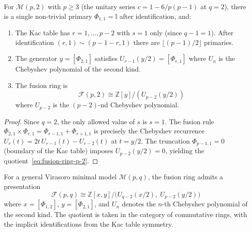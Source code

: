 \begin{proposition}\label{prop:fusion-ring-p-2}
For $\mathcal{M}(p,2)$ with $p \geq 3$ (the unitary series $c = 1 - 6/p(p{-}1)$
at $q = 2$), there is a single non-trivial primary $\Phi_{1,1} = \mathbb{I}$
after identification, and:
\begin{enumerate}
\item The Kac table has $r = 1, \ldots, p{-}2$ with $s = 1$ only (since $q{-}1 = 1$).
After identification $(r,1) \sim (p{-}1{-}r, 1)$ there are $\lfloor(p{-}1)/2\rfloor$ primaries.
\item The generator $y = [\Phi_{2,1}]$ satisfies
$U_{r-1}(y/2) = [\Phi_{r,1}]$ where $U_n$ is the Chebyshev polynomial
of the second kind.
\item The fusion ring is
\begin{equation}\label{eq:fusion-ring-p-2}
\mathcal{F}(p,2) \cong \mathbb{Z}[y]/(U_{p-2}(y/2))
\end{equation}
where $U_{p-2}$ is the $(p{-}2)$-nd Chebyshev polynomial.
\end{enumerate}
\end{proposition}

\begin{proof}
Since $q = 2$, the only allowed value of $s$ is $s = 1$.  The fusion rule
$\Phi_{2,1}\times\Phi_{r,1} = \Phi_{r-1,1} + \Phi_{r+1,1}$ is precisely the
Chebyshev recurrence $U_r(t) = 2t\,U_{r-1}(t) - U_{r-2}(t)$ at $t = y/2$.
The truncation $\Phi_{p-1,1} = 0$ (boundary of the Kac table) imposes
$U_{p-2}(y/2) = 0$, yielding the quotient~\eqref{eq:fusion-ring-p-2}.
\end{proof}

\begin{theorem}\label{thm:fusion-ring-quotient}
For a general Virasoro minimal model $\mathcal{M}(p,q)$, the fusion ring admits
a presentation
\begin{equation}\label{eq:fusion-ring-pq}
\mathcal{F}(p,q) \cong \mathbb{Z}[x,y]\big/\bigl(U_{q-2}(x/2),\; U_{p-2}(y/2)\bigr)
\end{equation}
where $x = [\Phi_{1,2}]$, $y = [\Phi_{2,1}]$, and $U_n$ denotes the $n$-th
Chebyshev polynomial of the second kind.  The quotient is taken in the category
of commutative rings, with the implicit identifications from the Kac table
symmetry.
\end{theorem}

